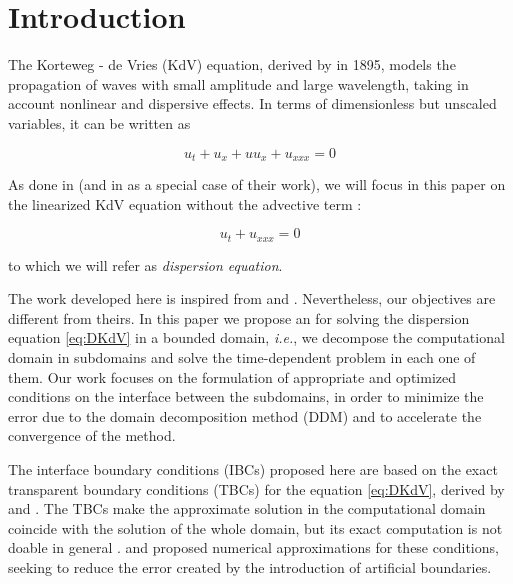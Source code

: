\section{Introduction}

\indent The Korteweg - de Vries (KdV) equation, derived by \cite{kdv1895} in 1895, models the propagation of waves with small amplitude and large wavelength, taking in account nonlinear and dispersive effects. In terms of dimensionless but unscaled variables, it can be written as \cite{BBM1971}

\begin{equation*}
	u_t + u_x + uu_x + u_{xxx} = 0
\end{equation*}

\indent As done in \cite{zheng2008} (and in \cite{besse2015} as a special case of their work), we will focus in this paper on the linearized KdV equation without the advective term : 

\begin{equation}
 \label{eq:DKdV}
	u_t  + u_{xxx} = 0
\end{equation}

\noindent to which we will refer as \emph{dispersion equation}.

\indent The work developed here is inspired from \cite{zheng2008} and \cite{besse2015}. Nevertheless, our objectives are different from theirs. In this paper we propose an  for solving the dispersion equation \eqref{eq:DKdV} in a bounded domain, \emph{i.e.}, we decompose the computational domain in subdomains and solve the time-dependent problem in each one of them. Our work focuses on the formulation of appropriate and optimized conditions on the interface between the subdomains, in order to minimize the error due to the domain decomposition method (DDM) and to accelerate the convergence of the method.

\indent The interface boundary conditions (IBCs) proposed here are based on the exact transparent boundary conditions (TBCs) for the equation \eqref{eq:DKdV}, derived by \cite{zheng2008} and \cite{besse2015}. The TBCs make the approximate solution in the computational domain coincide with the solution of the whole domain, but its exact computation is not doable in general \cite{Xavieretal2008}. \cite{zheng2008} and \cite{besse2015} proposed numerical approximations for these conditions, seeking to reduce the error created by the introduction of artificial boundaries.

